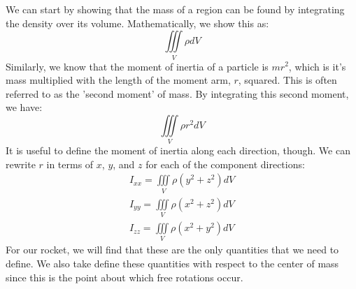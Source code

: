 \documentclass[12pt]{report}
\begin{document}
We can start by showing that the mass of a region can be found by integrating the density over its volume. Mathematically, we show this as:
$$\iiint\limits_V{\rho}{dV}$$
Similarly, we know that the \gls{moment of inertia} of a particle is $mr^2$, which is it's mass multiplied with the length of the moment arm, $r$, squared. This is often referred to as the 'second moment' of mass. By integrating this second moment, we have:
$$\iiint\limits_V{\rho}{r^2}{dV}$$
It is useful to define the \gls{moment of inertia} along each direction, though. We can rewrite $r$ in terms of $x$, $y$, and $z$ for each of the component directions:
\begin{gather}
    I_{xx}=\iiint\limits_V{\rho}{\left(y^2+z^2\right)}{dV}\\
    I_{yy}=\iiint\limits_V{\rho}{\left(x^2+z^2\right)}{dV}\\
    I_{zz}=\iiint\limits_V{\rho}{\left(x^2+y^2\right)}{dV}
\end{gather}
For our rocket, we will find that these are the only quantities that we need to define. We also take define these quantities with respect to the center of mass since this is the point about which free rotations occur.
\end{document}
